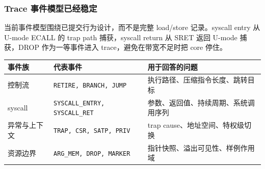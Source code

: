 \documentclass[aspectratio=169,10pt]{beamer}
\begin{document}
\begin{frame}
  \frametitle{Trace 事件模型已经稳定}
  \vskip0.1cm

  当前事件模型围绕\alert{已提交行为}设计，而不是完整 load/store 记录。syscall entry 从 U-mode ECALL 的 trap path 捕获，syscall return 从 SRET 返回 U-mode 捕获，DROP 作为一等事件进入 trace，避免在带宽不足时把 core 停住。

  \vskip0.22cm
  \begin{center}\scriptsize
  \setlength{\tabcolsep}{5pt}
  \begin{tabular}{@{}lll@{}}
    \toprule
    \textbf{事件族} & \textbf{代表事件} & \textbf{用于回答的问题} \\
    \midrule
    控制流 & \texttt{RETIRE, BRANCH, JUMP} & 执行路径、压缩指令长度、跳转目标 \\
    syscall & \texttt{SYSCALL\_ENTRY, SYSCALL\_RET} & 参数、返回值、持续周期、系统调用序列 \\
    异常与上下文 & \texttt{TRAP, CSR, SATP, PRIV} & trap cause、地址空间、特权级切换 \\
    资源边界 & \texttt{ARG\_MEM, DROP, MARKER} & 指针快照、溢出可见性、样例作用域 \\
    \bottomrule
  \end{tabular}
  \end{center}

  \vskip0.18cm
\end{frame}
\end{document}
